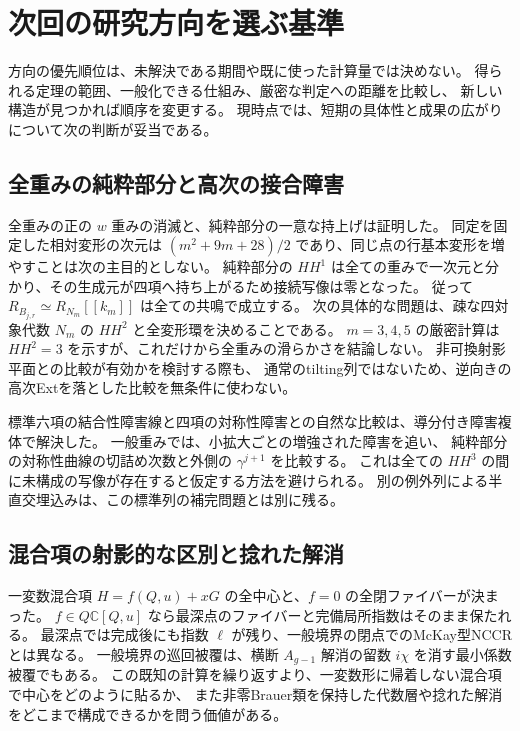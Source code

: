\section{次回の研究方向を選ぶ基準}

方向の優先順位は、未解決である期間や既に使った計算量では決めない。
得られる定理の範囲、一般化できる仕組み、厳密な判定への距離を比較し、
新しい構造が見つかれば順序を変更する。
現時点では、短期の具体性と成果の広がりについて次の判断が妥当である。

\subsection{全重みの純粋部分と高次の接合障害}

全重みの正の $w$ 重みの消滅と、純粋部分の一意な持上げは証明した。
同定を固定した相対変形の次元は $(m^2+9m+28)/2$ であり、同じ点の行基本変形を増やすことは次の主目的としない。
純粋部分の $HH^1$ は全ての重みで一次元と分かり、その生成元が四項へ持ち上がるため接続写像は零となった。
従って $R_{B_{j,r}}\simeq R_{N_m}[[k_m]]$ は全ての共鳴で成立する。
次の具体的な問題は、疎な四対象代数 $N_m$ の $HH^2$ と全変形環を決めることである。
$m=3,4,5$ の厳密計算は $HH^2=3$ を示すが、これだけから全重みの滑らかさを結論しない。
非可換射影平面との比較が有効かを検討する際も、
通常のtilting列ではないため、逆向きの高次Extを落とした比較を無条件に使わない。

標準六項の結合性障害線と四項の対称性障害との自然な比較は、導分付き障害複体で解決した。
一般重みでは、小拡大ごとの増強された障害を追い、
純粋部分の対称性曲線の切詰め次数と外側の $\gamma^{j+1}$ を比較する。
これは全ての $HH^3$ の間に未構成の写像が存在すると仮定する方法を避けられる。
別の例外列による半直交埋込みは、この標準列の補完問題とは別に残る。

\subsection{混合項の射影的な区別と捻れた解消}

一変数混合項 $H=f(Q,u)+xG$ の全中心と、$f=0$ の全閉ファイバーが決まった。
$f\in Q\mathbb C[Q,u]$ なら最深点のファイバーと完備局所指数はそのまま保たれる。
最深点では完成後にも指数 $\ell$ が残り、一般境界の閉点でのMcKay型NCCRとは異なる。
一般境界の巡回被覆は、横断 $A_{g-1}$ 解消の留数 $i\chi$ を消す最小係数被覆でもある。
この既知の計算を繰り返すより、一変数形に帰着しない混合項で中心をどのように貼るか、
また非零Brauer類を保持した代数層や捻れた解消をどこまで構成できるかを問う価値がある。

